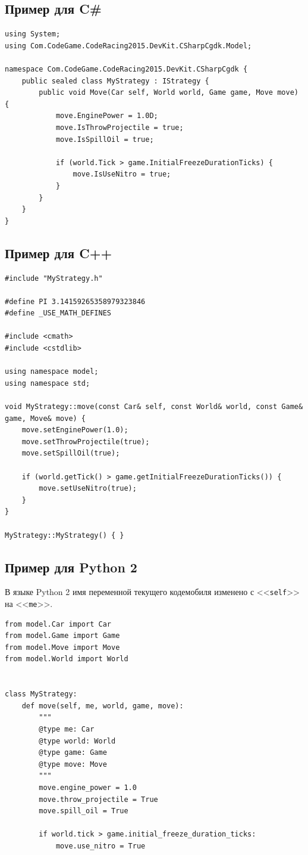 \subsection{Пример для C\#}

\begin{verbatim}
using System;
using Com.CodeGame.CodeRacing2015.DevKit.CSharpCgdk.Model;

namespace Com.CodeGame.CodeRacing2015.DevKit.CSharpCgdk {
    public sealed class MyStrategy : IStrategy {
        public void Move(Car self, World world, Game game, Move move) {
            move.EnginePower = 1.0D;
            move.IsThrowProjectile = true;
            move.IsSpillOil = true;

            if (world.Tick > game.InitialFreezeDurationTicks) {
                move.IsUseNitro = true;
            }
        }
    }
}
\end{verbatim}

\newpage
\subsection{Пример для C++}

\begin{verbatim}
#include "MyStrategy.h"

#define PI 3.14159265358979323846
#define _USE_MATH_DEFINES

#include <cmath>
#include <cstdlib>

using namespace model;
using namespace std;

void MyStrategy::move(const Car& self, const World& world, const Game& game, Move& move) {
    move.setEnginePower(1.0);
    move.setThrowProjectile(true);
    move.setSpillOil(true);

    if (world.getTick() > game.getInitialFreezeDurationTicks()) {
        move.setUseNitro(true);
    }
}

MyStrategy::MyStrategy() { }
\end{verbatim}

\newpage
\subsection{Пример для Python 2}

В языке Python 2 имя переменной текущего кодемобиля изменено с <<\texttt{self}>> на <<\texttt{me}>>.

\begin{verbatim}
from model.Car import Car
from model.Game import Game
from model.Move import Move
from model.World import World


class MyStrategy:
    def move(self, me, world, game, move):
        """
        @type me: Car
        @type world: World
        @type game: Game
        @type move: Move
        """
        move.engine_power = 1.0
        move.throw_projectile = True
        move.spill_oil = True

        if world.tick > game.initial_freeze_duration_ticks:
            move.use_nitro = True
\end{verbatim}

